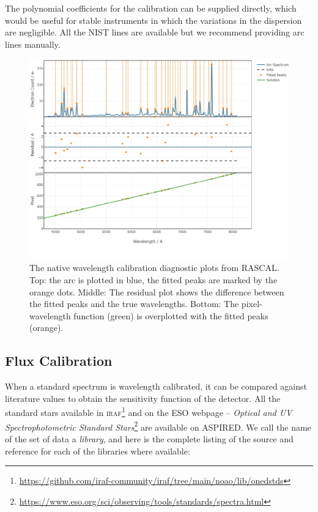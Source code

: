 \documentclass[linenumbers, twocolumn]{aastex631}
\begin{document}
The polynomial coefficients for the calibration can be supplied
directly, which would be useful for stable instruments in which
the variations in the dispersion are negligible. All the NIST lines
are available but we recommend providing arc lines manually.

\begin{figure}
    \centering
    \includegraphics[width=\columnwidth]{fig_05_wavelength_calibration_diagnostics.pdf}
    \caption{The native wavelength calibration diagnostic plots from RASCAL.
    Top: the arc is plotted in blue, the fitted peaks are marked by
    the orange dots. Middle: The residual plot shows the difference
    between the fitted peaks and the true wavelengths. Bottom: The
    pixel-wavelength function (green) is overplotted with the fitted
    peaks (orange).}
    \label{fig:wavecal}
\end{figure}

\subsection{Flux Calibration}
When a standard spectrum is wavelength calibrated, it can be
compared against literature values to obtain the sensitivity
function of the detector. All the standard stars available in
\textsc{iraf}\footnote{\url{https://github.com/iraf-community/iraf/tree/main/noao/lib/onedstds}}
and on the ESO webpage -- \textit{Optical and UV Spectrophotometric
Standard Stars}\footnote{\url{https://www.eso.org/sci/observing/tools/standards/spectra.html}}
are available on \textsc{ASPIRED}. We call the name of the set of data a
\textit{library}, and here is the complete listing of the source and reference
for each of the libraries where available:
\end{document}

